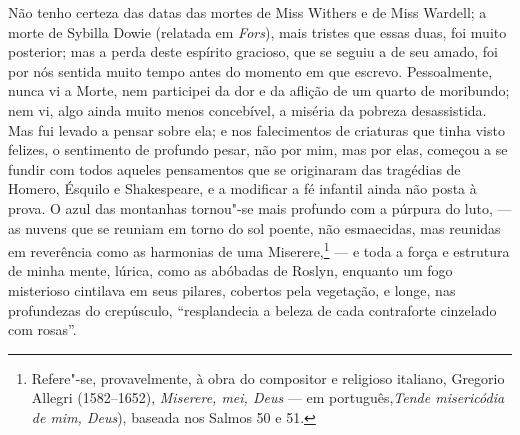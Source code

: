 Não tenho certeza das datas das mortes de Miss Withers e de Miss
Wardell; a morte de Sybilla Dowie (relatada em \textit{Fors}), mais
tristes que essas duas, foi muito posterior; mas a perda deste espírito
gracioso, que se seguiu a de seu amado, foi por nós sentida muito tempo
antes do momento em que escrevo. Pessoalmente, nunca vi a Morte, nem
participei da dor e da aflição de um quarto de moribundo; nem vi, algo
ainda muito menos concebível, a miséria da pobreza desassistida. Mas fui
levado a pensar sobre ela; e nos falecimentos de criaturas que tinha
visto felizes, o sentimento de profundo pesar, não por mim, mas por
elas, começou a se fundir com todos aqueles pensamentos que se
originaram das tragédias de Homero, Ésquilo e Shakespeare, e a modificar
a fé infantil ainda não posta à prova. O azul das montanhas tornou"-se
mais profundo com a púrpura do luto, --- as nuvens que se reuniam em
torno do sol poente, não esmaecidas, mas reunidas em reverência como as
harmonias de uma Miserere,\footnote{Refere"-se, provavelmente, à obra do
  compositor e religioso italiano, Gregorio Allegri (1582--1652),
  \textit{Miserere, mei, Deus} --- em português,\textit{Tende misericódia de mim, Deus}), baseada nos Salmos 50 e 51.} --- e toda a força e
estrutura de minha mente, lúrica, como as abóbadas de Roslyn, enquanto
um fogo misterioso cintilava em seus pilares, cobertos pela vegetação, e
longe, nas profundezas do crepúsculo, ``resplandecia a beleza de cada
contraforte cinzelado com rosas''.
